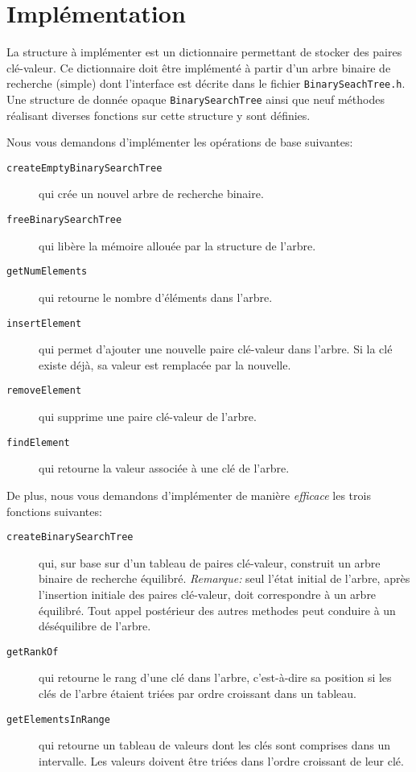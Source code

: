 \documentclass[a4paper,10pt]{article}
\begin{document}
\section{Implémentation}

La structure à implémenter est un dictionnaire permettant de stocker des paires
clé-valeur. Ce dictionnaire doit être implémenté à partir d'un arbre binaire de
recherche (simple) dont l'interface est décrite dans le fichier
\texttt{BinarySeachTree.h}. Une structure de donnée opaque
\texttt{BinarySearchTree} ainsi que neuf méthodes réalisant diverses fonctions
sur cette structure y sont définies.

Nous vous demandons d'implémenter les opérations de base suivantes:
\begin{description}
\item[\texttt{createEmptyBinarySearchTree}] qui crée un nouvel arbre de recherche binaire.
\item[\texttt{freeBinarySearchTree}]  qui libère la mémoire allouée par la structure de l'arbre.
\item[\texttt{getNumElements}] qui retourne le nombre d'éléments dans l'arbre.
\item[\texttt{insertElement}] qui permet d'ajouter une nouvelle paire clé-valeur dans l'arbre. Si la clé existe déjà, sa valeur est remplacée par la nouvelle.
\item[\texttt{removeElement}] qui supprime une paire clé-valeur de l'arbre.
\item[\texttt{findElement}] qui retourne la valeur associée à une clé de l'arbre.
\end{description}

De plus, nous vous demandons d'implémenter de manière {\em efficace} les trois fonctions suivantes:
\begin{description}
\item[\texttt{createBinarySearchTree}] qui, sur base sur d'un tableau de paires clé-valeur, construit un arbre binaire de recherche équilibré. \textit{Remarque:} seul l'état initial de l'arbre, après l'insertion initiale des paires clé-valeur, doit correspondre à un arbre équilibré. Tout appel postérieur des autres methodes peut conduire à un déséquilibre de l'arbre.
\item[\texttt{getRankOf}] qui retourne le rang d'une clé dans l'arbre, c'est-à-dire sa position si les clés de l'arbre étaient triées par ordre croissant dans un tableau.
\item[\texttt{getElementsInRange}] qui retourne un tableau de valeurs dont les clés sont comprises dans un intervalle. Les valeurs doivent être triées dans l'ordre croissant de leur clé.
\end{description}
\end{document}
